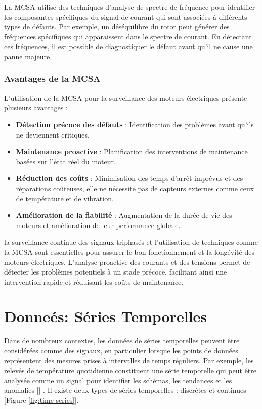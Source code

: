 La MCSA utilise des techniques d'analyse de spectre de fréquence pour
identifier les composantes spécifiques du signal de courant qui sont associées
à différents types de défauts. Par exemple, un déséquilibre du rotor peut
générer des fréquences spécifiques qui apparaissent dans le spectre de courant.
En détectant ces fréquences, il est possible de diagnostiquer le défaut avant
qu'il ne cause une panne majeure.

\subsubsection*{Avantages de la MCSA}

L'utilisation de la MCSA pour la surveillance des moteurs électriques présente
plusieurs avantages :
\begin{itemize}
	\item \textbf{Détection précoce des défauts} : Identification des problèmes avant qu'ils ne deviennent critiques.
	\item \textbf{Maintenance proactive} : Planification des interventions de maintenance basées sur l'état réel du moteur.
	\item \textbf{Réduction des coûts} : Minimisation des temps d'arrêt imprévus et des réparations coûteuses,
	      elle ne nécessite pas de capteurs externes comme ceux de température et de vibration.
	\item \textbf{Amélioration de la fiabilité} : Augmentation de la durée de vie des moteurs et amélioration de leur performance globale.
\end{itemize}

la surveillance continue des signaux triphasés et l'utilisation de techniques
comme la MCSA sont essentielles pour assurer le bon fonctionnement et la
longévité des moteurs électriques. L'analyse proactive des courants et des
tensions permet de détecter les problèmes potentiels à un stade précoce,
facilitant ainsi une intervention rapide et réduisant les coûts de maintenance.

\section{Donneés: Séries Temporelles}

Dans de nombreux contextes, les données de séries temporelles peuvent être
considérées comme des signaux, en particulier lorsque les points de données
représentent des mesures prises à intervalles de temps réguliers. Par exemple,
les relevés de température quotidienne constituent une série temporelle qui
peut être analysée comme un signal pour identifier les schémas, les tendances
et les anomalies [\cite{brophy2023gan}] . Il existe deux types de séries
temporelles : discrètes et continues [Figure \ref{fig:time-series}].

